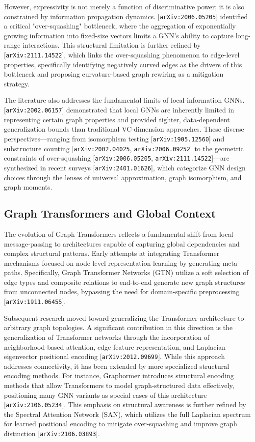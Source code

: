 \documentclass[11pt]{article}
\begin{document}
However, expressivity is not merely a function of discriminative power; it is also constrained by information propagation dynamics. [\texttt{arXiv:2006.05205}] identified a critical "over-squashing" bottleneck, where the aggregation of exponentially growing information into fixed-size vectors limits a GNN's ability to capture long-range interactions. This structural limitation is further refined by [\texttt{arXiv:2111.14522}], which links the over-squashing phenomenon to edge-level properties, specifically identifying negatively curved edges as the drivers of this bottleneck and proposing curvature-based graph rewiring as a mitigation strategy.

The literature also addresses the fundamental limits of local-information GNNs. [\texttt{arXiv:2002.06157}] demonstrated that local GNNs are inherently limited in representing certain graph properties and provided tighter, data-dependent generalization bounds than traditional VC-dimension approaches. These diverse perspectives—ranging from isomorphism testing [\texttt{arXiv:1905.12560}] and substructure counting [\texttt{arXiv:2002.04025}, \texttt{arXiv:2006.09252}] to the geometric constraints of over-squashing [\texttt{arXiv:2006.05205}, \texttt{arXiv:2111.14522}]—are synthesized in recent surveys [\texttt{arXiv:2401.01626}], which categorize GNN design choices through the lenses of universal approximation, graph isomorphism, and graph moments.

\subsection{Graph Transformers and Global Context}

The evolution of Graph Transformers reflects a fundamental shift from local message-passing to architectures capable of capturing global dependencies and complex structural patterns. Early attempts at integrating Transformer mechanisms focused on node-level representation learning by generating meta-paths. Specifically, Graph Transformer Networks (GTN) utilize a soft selection of edge types and composite relations to end-to-end generate new graph structures from unconnected nodes, bypassing the need for domain-specific preprocessing [\texttt{arXiv:1911.06455}].

Subsequent research moved toward generalizing the Transformer architecture to arbitrary graph topologies. A significant contribution in this direction is the generalization of Transformer networks through the incorporation of neighborhood-based attention, edge feature representation, and Laplacian eigenvector positional encoding [\texttt{arXiv:2012.09699}]. While this approach addresses connectivity, it has been extended by more specialized structural encoding methods. For instance, Graphormer introduces structural encoding methods that allow Transformers to model graph-structured data effectively, positioning many GNN variants as special cases of this architecture [\texttt{arXiv:2106.05234}]. This emphasis on structural awareness is further refined by the Spectral Attention Network (SAN), which utilizes the full Laplacian spectrum for learned positional encoding to mitigate over-squashing and improve graph distinction [\texttt{arXiv:2106.03893}].
\end{document}
